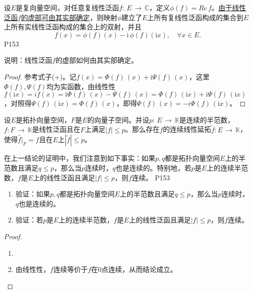 \original
{
	设$E$是复向量空间，对任意复线性泛函$f:\, E\,\rightarrow\, \mathbb{C} $，定义$\phi(f)=Re\, f $。\underline{由于线性泛函$f$的虚部可由其实部确定}，则映射$\phi$建立了$E$上所有复线性泛函构成的集合到$E$上所有实线性泛函构成的集合上的双射，并且
	\begin{equation*}\tag{+}
		f(x)=\phi (f)(x)-\mathrm{i} \, \phi (f)(\mathrm{i} x),\quad \forall x\in E.
	\end{equation*}
}{P153}

\begin{proposition}
	说明：线性泛函$f$的虚部如何由其实部确定。
\end{proposition}
\begin{proof}
	参考式子(+)。记$f(x)=\Phi(f)\,(x)+\mathrm{i}\Psi(f)\,(x) $，这里$\Phi(f),\Psi(f)$均为实函数，由线性性$f(\mathrm{i}x)=if(x)=\mathrm{i}\Phi(f)\, (x) -\Psi(f) \, (x)= \Phi(f)\, (\mathrm{i}x) +\mathrm{i}\Psi(f)\, (\mathrm{i}x) $，对照得$\Psi(f)\,(\mathrm{i}x)=\Phi(f)\,(x) $，即得$\Psi(f)\, (x)=-i\Phi(f)\, (\mathrm{i}x) $。
\end{proof}

\begin{corollary}
	设$E$是拓扑向量空间，$F$是$E$的向量子空间。并设$p:\,E \, \rightarrow \, \mathbb{K} $是连续的半范数，$f:F\, \rightarrow \, \mathbb{K} $是线性泛函且在$F$上满足$|f|\leq p $。那么存在$f$的连续线性延拓$\tilde{f}: E\, \rightarrow \, \mathbb{K} $，使得$\tilde{f\big| }_{F} =f $且在$E$上$|\tilde{f}|\leq p $。
\end{corollary}

\original
{
	在上一结论的证明中，我们注意到如下事实：如果$p,q$都是拓扑向量空间$E$上的半范数且满足$q\leq p$，那么当$p$连续时，$q$也是连续的。特别地，若$p$是$E$上的连续半范数，$f$是$E$上的线性泛函且满足$|f|\leq p$，则$f$连续。
}{P153}

\begin{proposition}
	\begin{enumerate}
		\item 验证：如果$p,q$都是拓扑向量空间$E$上的半范数且满足$q\leq p$，那么当$p$连续时，$q$也是连续的。
		\item 验证：若$p$是$E$上的连续半范数，$f$是$E$上的线性泛函且满足$|f|\leq p$，则$f$连续。
	\end{enumerate}
\end{proposition}
\begin{proof}
	\begin{enumerate}
		\item 
		\item 由线性性，$f$连续等价于$f$在$0$点连续，从而结论成立。
	\end{enumerate}
\end{proof}


